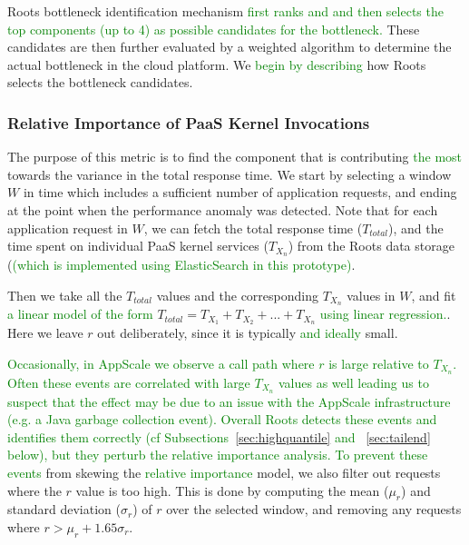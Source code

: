 Roots bottleneck identification mechanism \textcolor{green}{first ranks and
and then selects the top components (up to 4) as possible candidates
for the bottleneck.} These candidates are then further evaluated by a weighted algorithm to
determine the actual bottleneck in the cloud platform. We 
\textcolor{green}{begin by describing} 
how Roots selects the
bottleneck candidates.

\subsubsection{Relative Importance of PaaS Kernel Invocations} 
The purpose of this metric is to find the component that is contributing 
\textcolor{green}{the most} towards the variance in the total
response time. We start by selecting a window $W$ in time which includes a sufficient number of application requests,
and ending at the point when the performance anomaly was detected. Note that for each application request
in $W$, we can fetch the total response time ($T_{total}$), and the time spent on individual PaaS kernel
services ($T_{X_n}$) from the Roots data storage (\textcolor{green}{(which is
implemented using ElasticSearch in this prototype)}.

Then we take all the $T_{total}$ values
and the corresponding $T_{X_n}$ values in $W$, and fit 
\textcolor{green}{a linear model of the form}
$T_{total} = T_{X_1} + T_{X_2} + ... + T_{X_n}$
\textcolor{green}{using linear regression.}. Here we leave $r$ out
deliberately, since it is typically \textcolor{green}{and ideally} small. 

\textcolor{green}{Occasionally, in AppScale we observe a call path where $r$ is
large relative to $T_{X_n}$.  Often these events are correlated with large
$T_{X_n}$ values as well leading us to suspect that the effect may be due to
an issue with the AppScale infrastructure (e.g. a Java garbage collection
event).  Overall Roots detects these events and identifies them correctly (cf
Subsections~\ref{sec:highquantile} and ~\ref{sec:tailend} below), but they
perturb the relative importance analysis.   To prevent these events}
from skewing the \textcolor{green}{relative importance}  model, we also filter out requests where the $r$ value is too high. This
is done by computing the mean ($\mu_r$) and standard deviation ($\sigma_r$) of $r$ over the selected window, and removing 
any requests where $r > \mu_r + 1.65\sigma_r$.

